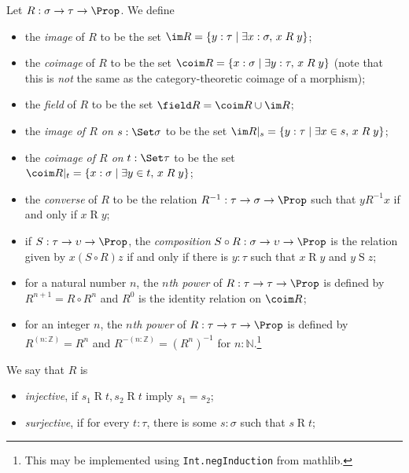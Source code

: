 \begin{definition}
  \label{def:relation_props}
  Let \( R : \sigma \to \tau \to \Prop \).
  We define
  \begin{itemize}
    \item the \emph{image} of \( R \) to be the set \( \im R = \{ y : \tau \mid \exists x : \sigma,\, x \mathrel{R} y \} \);
    \item the \emph{coimage} of \( R \) to be the set \( \coim R = \{ x : \sigma \mid \exists y : \tau,\, x \mathrel{R} y \} \) (note that this is \emph{not} the same as the category-theoretic coimage of a morphism);
    \item the \emph{field} of \( R \) to be the set \( \field R = \coim R \cup \im R \);
    \item the \emph{image of \( R \) on} \( s : \Set \sigma \) to be the set \( \im R|_s = \{ y : \tau \mid \exists x \in s,\, x \mathrel{R} y \} \);
    \item the \emph{coimage of \( R \) on} \( t : \Set \tau \) to be the set \( \coim R|_t = \{ x : \sigma \mid \exists y \in t,\, x \mathrel{R} y \} \);
    \item the \emph{converse} of \( R \) to be the relation \( R^{-1} : \tau \to \sigma \to \Prop \) such that \( y \mathrel{R^{-1}} x \) if and only if \( x \mathrel{R} y \);
    \item if \( S : \tau \to \upsilon \to \Prop \), the \emph{composition} \( S \circ R : \sigma \to \upsilon \to \Prop \) is the relation given by \( x \mathrel{(S\circ R)} z \) if and only if there is \( y : \tau \) such that \( x \mathrel{R} y \) and \( y \mathrel{S} z \);
    \item for a natural number \( n \), the \emph{\( n \)th power} of \( R : \tau \to \tau \to \Prop \) is defined by \( R^{n+1} = R \circ R^n \) and \( R^0 \) is the identity relation on \( \coim R \);
    \item for an integer \( n \), the \emph{\( n \)th power} of \( R : \tau \to \tau \to \Prop \) is defined by \( R^{(n : \mathbb Z)} = R^n \) and \( R^{-(n : \mathbb Z)} = (R^n)^{-1} \) for \( n : \mathbb N \).\footnote{This may be implemented using \texttt{Int.negInduction} from mathlib.}
  \end{itemize}
  We say that \( R \) is
  \begin{itemize}
    \item \emph{injective}, if \( s_1 \mathrel{R} t, s_2 \mathrel{R} t \) imply \( s_1 = s_2 \);
    \item \emph{surjective}, if for every \( t : \tau \), there is some \( s : \sigma \) such that \( s \mathrel{R} t \);

\end{itemize}
\end{definition}
